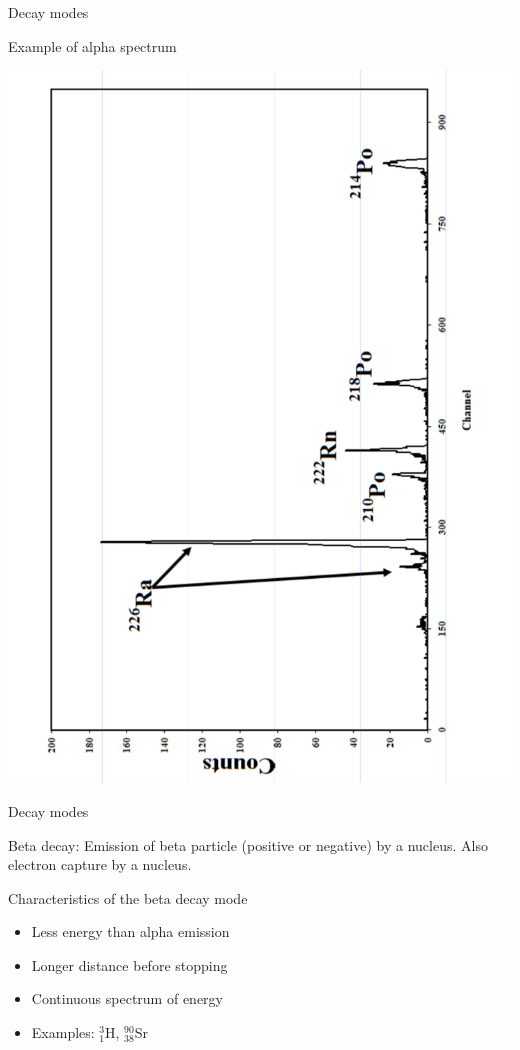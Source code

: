 \begin{frame}{Decay modes}

\alert{Example of alpha spectrum}

\centering
\includegraphics[scale=0.3,angle=-90]{figures/20160218_rsw_alphaspectrum.pdf}

\end{frame}

\begin{frame}{Decay modes}

\alert{Beta decay: Emission of beta particle (positive or negative) by a nucleus. Also electron capture by a nucleus.}

\begin{exampleblock}{Characteristics of the beta decay mode}

\begin{itemize}
\item Less energy than alpha emission 
\item Longer distance before stopping 
\item Continuous spectrum of energy
\item Examples: $^{3}_{1}$H, $^{90}_{38}$Sr
\end{itemize}

\end{exampleblock}

\end{frame}

